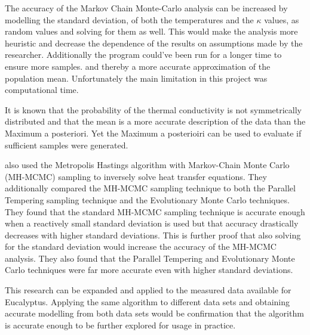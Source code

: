 The accuracy of the Markov Chain Monte-Carlo analysis can be increased by modelling the standard deviation, of both the temperatures and the $\kappa$ values, as random values and solving for them as well. 
This would make the analysis more heuristic and decrease the dependence of the results on assumptions made by the researcher. 
Additionally the program could've been run for a longer time to ensure more samples. and thereby a more accurate approximation of the population mean. 
Unfortunately the main limitation in this project was computational time.

It is known that the probability of the thermal conductivity is not symmetrically distributed and that the mean is a more accurate description of the data than the Maximum a posteriori.
Yet the Maximum a posterioiri can be used to evaluate if sufficient samples were generated.




\cite{somasund:2016} also used the Metropolis Hastings algorithm with Markov-Chain Monte Carlo (MH-MCMC) sampling to inversely solve heat transfer equations.
They additionally compared the MH-MCMC sampling technique to both the Parallel Tempering sampling technique and the Evolutionary Monte Carlo techniques.
They found that the standard MH-MCMC sampling technique is accurate enough when a reactively small standard deviation is used but that accuracy drastically decreases with higher standard deviations.
This is further proof that also solving for the standard deviation would increase the accuracy of the MH-MCMC analysis.
They also found that the Parallel Tempering and Evolutionary Monte Carlo techniques were far more accurate even with higher standard deviations.

This research can be expanded and applied to the measured data available for Eucalyptus. 
Applying the same algorithm to different data sets and obtaining accurate modelling from both data sets would be confirmation that the algorithm is accurate enough to be further explored for usage in practice.



